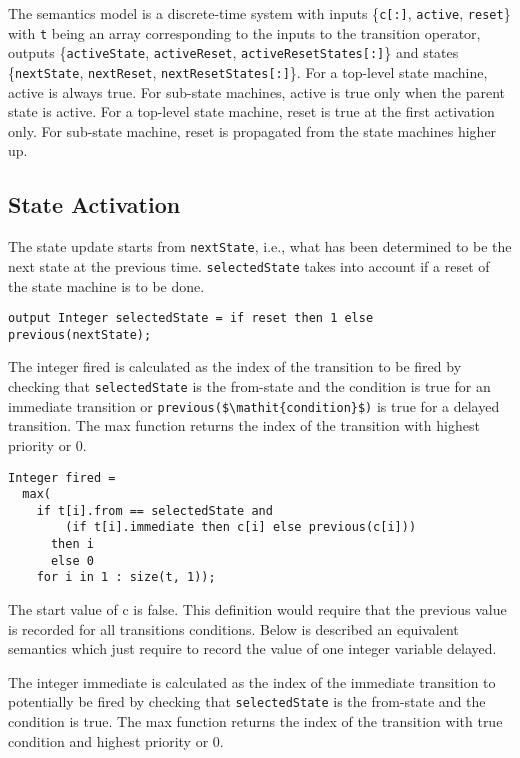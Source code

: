 The semantics model is a discrete-time system with inputs \{\lstinline!c[:]!, \lstinline!active!, \lstinline!reset!\} with \lstinline!t! being an array corresponding to the inputs to the transition operator, outputs \{\lstinline!activeState!, \lstinline!activeReset!, \lstinline!activeResetStates[:]!\} and states \{\lstinline!nextState!, \lstinline!nextReset!, \lstinline!nextResetStates[:]!\}.
For a top-level state machine, active is always true.
For sub-state machines, active is true only when the parent state is active.
For a top-level state machine, reset is true at the first activation only.
For sub-state machine, reset is propagated from the state machines higher up.

\subsection{State Activation}\label{state-activation}

The state update starts from \lstinline!nextState!, i.e., what has been determined to be the next state at the previous time.
\lstinline!selectedState! takes into account if a reset of the state machine is to be done.

\begin{lstlisting}[language=modelica]
output Integer selectedState = if reset then 1 else previous(nextState);
\end{lstlisting}
The integer fired is calculated as the index of the transition to be fired by checking that \lstinline!selectedState! is the from-state and the condition is true for an immediate transition or \lstinline!previous($\mathit{condition}$)! is true for a delayed transition.
The max function returns the index of the transition with highest priority or 0.

\begin{lstlisting}[language=modelica]
Integer fired =
  max(
    if t[i].from == selectedState and
        (if t[i].immediate then c[i] else previous(c[i]))
      then i
      else 0
    for i in 1 : size(t, 1));
\end{lstlisting}
The start value of c is false.
This definition would require that the previous value is recorded for all transitions conditions.
Below is described an equivalent semantics which just require to record the value of one integer variable delayed.

The integer immediate is calculated as the index of the immediate transition to potentially be fired by checking that \lstinline!selectedState! is the from-state and the condition is true.
The max function returns the index of the transition with true condition and highest priority or 0.

